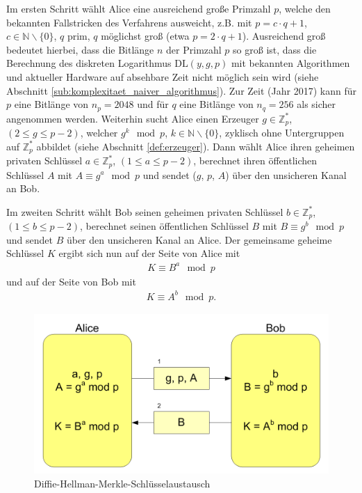 \documentclass[
  a4paper,
  11pt,
]{scrartcl}
\theoremstyle{plain}
\theoremstyle{definition}
\theoremstyle{remark}
\newcommand{\N}{\mathbb{N}}
\newcommand{\Z}{\mathbb{Z}}
\begin{document}
Im ersten Schritt wählt Alice eine ausreichend große Primzahl $p$, welche den bekannten Fallstricken des Verfahrens ausweicht, z.B. mit $p = c \cdot q+1$, $c \in \N\backslash\{0\}$, $q$ prim, $q$ möglichst groß (etwa $p = 2 \cdot q + 1$). Ausreichend groß bedeutet hierbei, dass die Bitlänge $n$ der Primzahl $p$ so groß ist, dass die Berechnung des diskreten Logarithmus $\text{DL}(y,g,p)$ mit bekannten Algorithmen und aktueller Hardware auf absehbare Zeit nicht möglich sein wird (siehe Abschnitt \ref{sub:komplexitaet_naiver_algorithmus}). Zur Zeit (Jahr 2017) kann für $p$ eine Bitlänge von $n_p = 2048$ und für $q$ eine Bitlänge von $n_q = 256$ als sicher angenommen werden. Weiterhin sucht Alice einen Erzeuger $g \in \Z_p^*$, $(2 \leq g \leq p-2)$, welcher $g^k \mod p$, $k \in \N \backslash \{0\}$, zyklisch ohne Untergruppen auf $\Z_p^*$ abbildet (siehe Abschnitt \ref{def:erzeuger}). Dann wählt Alice ihren geheimen privaten Schlüssel $a \in \Z_p^*$, $(1 \leq a \leq p-2)$,  berechnet ihren öffentlichen Schlüssel $A$ mit $A \equiv g^a \mod p$ und sendet ($g$, $p$, $A$) über den unsicheren Kanal an Bob.

Im zweiten Schritt wählt Bob seinen geheimen privaten Schlüssel $b \in \Z_p^*$, $(1 \leq b \leq p-2)$, berechnet seinen öffentlichen Schlüssel $B$ mit $B \equiv g^b \mod p$ und sendet $B$ über den unsicheren Kanal an Alice.
Der gemeinsame geheime Schlüssel $K$ ergibt sich nun auf der Seite von Alice mit
\begin{align*}
	K \equiv B^a \mod p
\end{align*}
und auf der Seite von Bob mit
\begin{align*}
	K \equiv A^b \mod p \text{.}
\end{align*}

\begin{figure}[H]
  \centering
  \includegraphics[width=\textwidth]{Diffie-Hellman-Schluesselaustausch2.png}
  \caption{Diffie-Hellman-Merkle-Schlüsselaustausch}
  \label{fig:dhke}
\end{figure}
\end{document}
